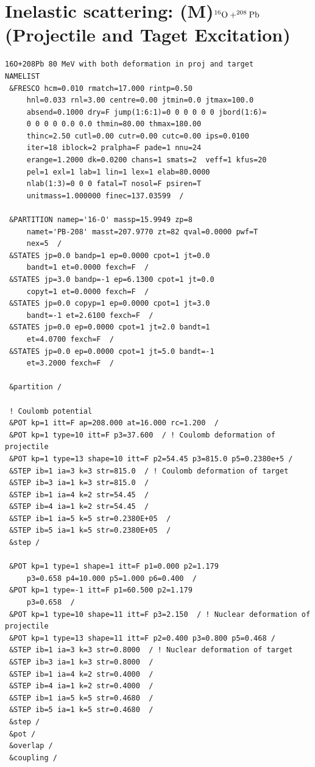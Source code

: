 \documentclass[11pt]{book}
\begin{document}
\section{Inelastic scattering: (M)$^{16}{\rm O}+^{208}{\rm Pb}$ 
(Projectile and Taget Excitation) } 

\begin{small} 
\begin{lstlisting}[frame=single]
16O+208Pb 80 MeV with both deformation in proj and target 
NAMELIST
 &FRESCO hcm=0.010 rmatch=17.000 rintp=0.50 
	 hnl=0.033 rnl=3.00 centre=0.00 jtmin=0.0 jtmax=100.0 
	 absend=0.1000 dry=F jump(1:6:1)=0 0 0 0 0 0 jbord(1:6)=
	 0 0 0 0 0.0 0.0 thmin=80.00 thmax=180.00 
	 thinc=2.50 cutl=0.00 cutr=0.00 cutc=0.00 ips=0.0100 
	 iter=18 iblock=2 pralpha=F pade=1 nnu=24 
	 erange=1.2000 dk=0.0200 chans=1 smats=2  veff=1 kfus=20 
	 pel=1 exl=1 lab=1 lin=1 lex=1 elab=80.0000 
	 nlab(1:3)=0 0 0 fatal=T nosol=F psiren=T 
	 unitmass=1.000000 finec=137.03599  /

 &PARTITION namep='16-O' massp=15.9949 zp=8 
	 namet='PB-208' masst=207.9770 zt=82 qval=0.0000 pwf=T 
	 nex=5  /
 &STATES jp=0.0 bandp=1 ep=0.0000 cpot=1 jt=0.0 
	 bandt=1 et=0.0000 fexch=F  /
 &STATES jp=3.0 bandp=-1 ep=6.1300 cpot=1 jt=0.0 
	 copyt=1 et=0.0000 fexch=F  /
 &STATES jp=0.0 copyp=1 ep=0.0000 cpot=1 jt=3.0 
	 bandt=-1 et=2.6100 fexch=F  /
 &STATES jp=0.0 ep=0.0000 cpot=1 jt=2.0 bandt=1 
	 et=4.0700 fexch=F  /
 &STATES jp=0.0 ep=0.0000 cpot=1 jt=5.0 bandt=-1 
	 et=3.2000 fexch=F  /

 &partition /
 
 ! Coulomb potential
 &POT kp=1 itt=F ap=208.000 at=16.000 rc=1.200  /
 &POT kp=1 type=10 itt=F p3=37.600  / ! Coulomb deformation of projectile
 &POT kp=1 type=13 shape=10 itt=F p2=54.45 p3=815.0 p5=0.2380e+5 /
 &STEP ib=1 ia=3 k=3 str=815.0  / ! Coulomb deformation of target
 &STEP ib=3 ia=1 k=3 str=815.0  /
 &STEP ib=1 ia=4 k=2 str=54.45  /
 &STEP ib=4 ia=1 k=2 str=54.45  /
 &STEP ib=1 ia=5 k=5 str=0.2380E+05  /
 &STEP ib=5 ia=1 k=5 str=0.2380E+05  /
 &step / 
 
 &POT kp=1 type=1 shape=1 itt=F p1=0.000 p2=1.179 
	 p3=0.658 p4=10.000 p5=1.000 p6=0.400  /
 &POT kp=1 type=-1 itt=F p1=60.500 p2=1.179 
	 p3=0.658  /
 &POT kp=1 type=10 shape=11 itt=F p3=2.150  / ! Nuclear deformation of projectile
 &POT kp=1 type=13 shape=11 itt=F p2=0.400 p3=0.800 p5=0.468 /
 &STEP ib=1 ia=3 k=3 str=0.8000  / ! Nuclear deformation of target
 &STEP ib=3 ia=1 k=3 str=0.8000  /
 &STEP ib=1 ia=4 k=2 str=0.4000  /
 &STEP ib=4 ia=1 k=2 str=0.4000  /
 &STEP ib=1 ia=5 k=5 str=0.4680  /
 &STEP ib=5 ia=1 k=5 str=0.4680  /
 &step / 
 &pot / 
 &overlap / 
 &coupling / 
\end{lstlisting}
\end{small}
\end{document}
